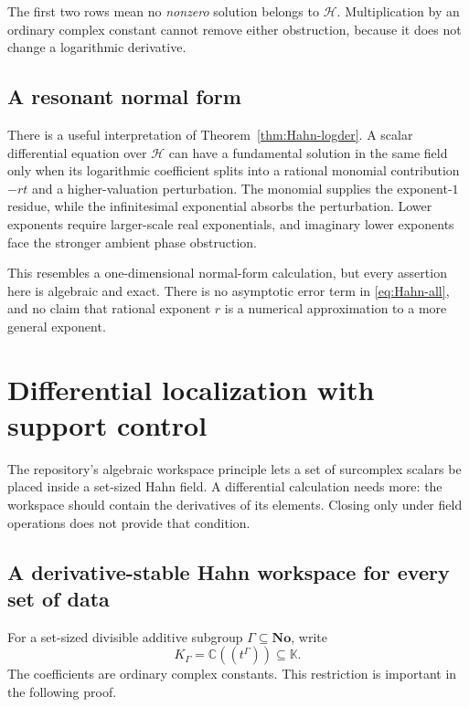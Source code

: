 \documentclass[11pt,a4paper]{article}
\numberwithin{equation}{section}
\theoremstyle{definition}
\theoremstyle{remark}
\newcommand{\No}{\mathbf{No}}
\newcommand{\K}{\mathbb K}
\newcommand{\C}{\mathbb C}
\newcommand{\HH}{\mathscr H}
\begin{document}
The first two rows mean no \emph{nonzero} solution belongs to $\HH$.
Multiplication by an ordinary complex constant cannot remove either
obstruction, because it does not change a logarithmic derivative.

\subsection{A resonant normal form}

There is a useful interpretation of Theorem~\ref{thm:Hahn-logder}.
A scalar differential equation over $\HH$ can have a fundamental solution
in the same field only when its logarithmic coefficient splits into a
rational monomial contribution $-rt$ and a higher-valuation perturbation.
The monomial supplies the exponent-$1$ residue, while the infinitesimal
exponential absorbs the perturbation. Lower exponents require larger-scale
real exponentials, and imaginary lower exponents face the stronger ambient
phase obstruction.

This resembles a one-dimensional normal-form calculation, but every
assertion here is algebraic and exact. There is no asymptotic error term in
\eqref{eq:Hahn-all}, and no claim that rational exponent $r$ is a numerical
approximation to a more general exponent.

\section{Differential localization with support control}
\label{sec:localization}

The repository's algebraic workspace principle lets a set of surcomplex
scalars be placed inside a set-sized Hahn field. A differential calculation
needs more: the workspace should contain the derivatives of its elements.
Closing only under field operations does not provide that condition.

\subsection{A derivative-stable Hahn workspace for every set of data}

For a set-sized divisible additive subgroup $\Gamma\subseteq\No$, write
\[
 K_\Gamma=\C((t^\Gamma))\subseteq\K.
\]
The coefficients are ordinary complex constants. This restriction is
important in the following proof.
\end{document}
